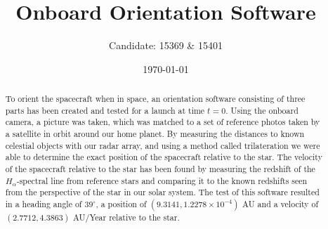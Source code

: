 \documentclass[reprint,english,notitlepage]{revtex4-2}
\begin{document}
\title{Onboard Orientation Software}
\author{Candidate: 15369 \& 15401}
\date{\today}

\begin{abstract}
    To orient the spacecraft when in space, an orientation software consisting of three parts has been created and tested for a launch at time $t = 0$.
	Using the onboard camera, a picture was taken, which was matched to a set of reference photos taken by a satellite in orbit around our home planet.
	By measuring the distances to known celestial objects with our radar array, and using a method called trilateration we were able to determine the exact position of the spacecraft relative to the star.
	The velocity of the spacecraft relative to the star has been found by measuring the redshift of the $H_{\alpha}$-spectral line from reference stars and comparing it to the known redshifts seen from the perspective of the star in our solar system.
	The test of this software resulted in a heading angle of $39^{\circ}$, a position of $(9.3141, 1.2278\times10^{-4})$ AU and a velocity of $(2.7712, 4.3863)$ AU/Year relative to the star.

\end{abstract}
\maketitle
\end{document}
